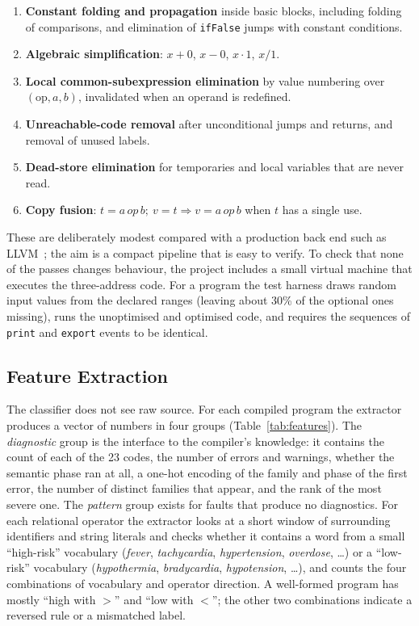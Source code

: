 \documentclass[conference]{IEEEtran}
\newcommand{\code}[1]{\texttt{#1}}
\begin{document}
\begin{enumerate}
    \item \textbf{Constant folding and propagation} inside basic blocks, including folding of comparisons, and
    elimination of \code{ifFalse} jumps with constant conditions.
    \item \textbf{Algebraic simplification}: $x+0$, $x-0$, $x\cdot 1$, $x/1$.
    \item \textbf{Local common-subexpression elimination} by value numbering over $(\text{op},a,b)$, invalidated when an
    operand is redefined.
    \item \textbf{Unreachable-code removal} after unconditional jumps and returns, and removal of unused labels.
    \item \textbf{Dead-store elimination} for temporaries and local variables that are never read.
    \item \textbf{Copy fusion}: $t=a\,\mathit{op}\,b;\ v=t \Rightarrow v=a\,\mathit{op}\,b$ when $t$ has a single use.
\end{enumerate}

These are deliberately modest compared with a production back end such as LLVM~\cite{lattner2004}; the aim is a
compact pipeline that is easy to verify. To check that none of the passes changes behaviour, the project includes a
small virtual machine that executes the three-address code. For a program the test harness draws random input values
from the declared ranges (leaving about 30\% of the optional ones missing), runs the unoptimised and optimised code, and
requires the sequences of \code{print} and \code{export} events to be identical.

\subsection{Feature Extraction}

The classifier does not see raw source. For each compiled program the extractor produces a vector of \NFeat{} numbers
in four groups (Table~\ref{tab:features}). The \emph{diagnostic} group is the interface to the compiler's knowledge:
it contains the count of each of the 23 codes, the number of errors and warnings, whether the semantic phase ran
at all, a one-hot encoding of the family and phase of the first error, the number of distinct families that
appear, and the rank of the most severe one. The \emph{pattern} group exists for faults that produce no diagnostics. For
each relational operator the extractor looks at a short window of surrounding identifiers and string literals and
checks whether it contains a word from a small ``high-risk'' vocabulary (\emph{fever}, \emph{tachycardia},
\emph{hypertension}, \emph{overdose}, \ldots) or a ``low-risk'' vocabulary (\emph{hypothermia}, \emph{bradycardia},
\emph{hypotension}, \ldots), and counts the four combinations of vocabulary and operator direction. A well-formed
program has mostly ``high with $>$'' and ``low with $<$''; the other two combinations indicate a reversed rule or a
mismatched label.
\end{document}

